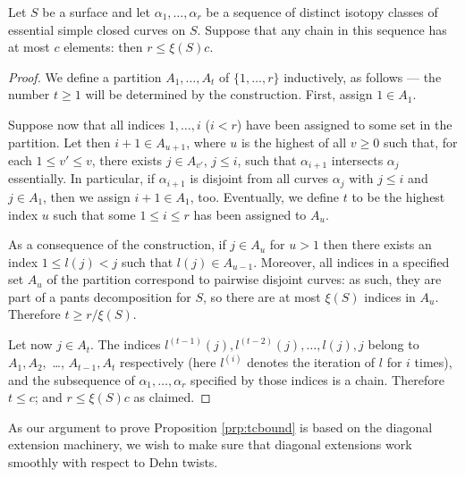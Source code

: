 \begin{lemma}\label{lem:chainbound}
Let $S$ be a surface and let $\alpha_1,\ldots,\alpha_r$ be a sequence of distinct isotopy classes of essential simple closed curves on $S$. Suppose that any chain in this sequence has at most $c$ elements: then $r\leq \xi(S)c$.
\end{lemma}
\begin{proof}
We define a partition $A_1,\ldots,A_t$ of $\{1,\ldots, r\}$ inductively, as follows --- the number $t\geq 1$ will be determined by the construction. First, assign $1\in A_1$.

Suppose now that all indices $1,\ldots,i$ ($i<r$) have been assigned to some set in the partition. Let then $i+1\in A_{u+1}$, where $u$ is the highest of all $v\geq 0$ such that, for each $1\leq v'\leq v$, there exists $j\in A_{v'}$, $j\leq i$, such that $\alpha_{i+1}$ intersects $\alpha_j$ essentially. In particular, if $\alpha_{i+1}$ is disjoint from all curves $\alpha_j$ with $j\leq i$ and $j\in A_1$, then we assign $i+1\in A_1$, too. Eventually, we define $t$ to be the highest index $u$ such that some $1\leq i\leq r$ has been assigned to $A_u$.

As a consequence of the construction, if $j\in A_u$ for $u>1$ then there exists an index $1\leq l(j)< j$ such that $l(j)\in A_{u-1}$. Moreover, all indices in a specified set $A_u$ of the partition correspond to pairwise disjoint curves: as such, they are part of a pants decomposition for $S$, so there are at most $\xi(S)$ indices in $A_u$. Therefore $t\geq r/\xi(S)$.

Let now $j\in A_t$. The indices $l^{(t-1)}(j),l^{(t-2)}(j),\ldots,l(j),j$ belong to $A_1,A_2,$ \ldots, $A_{t-1},A_t$ respectively (here $l^{(i)}$ denotes the iteration of $l$ for $i$ times), and the subsequence of $\alpha_1,\ldots,\alpha_r$ specified by those indices is a chain. Therefore $t\leq c$; and $r\leq \xi(S)c$ as claimed.
\end{proof}

As our argument to prove Proposition \ref{prp:tcbound} is based on the diagonal extension machinery, we wish to make sure that diagonal extensions work smoothly with respect to Dehn twists.

